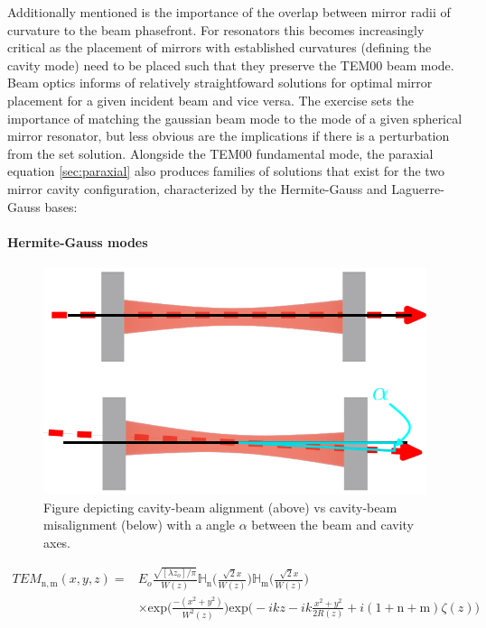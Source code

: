 Additionally mentioned is the importance of the overlap between mirror radii of curvature to the beam phasefront. For resonators this becomes increasingly critical as the placement of mirrors with established curvatures (defining the cavity mode) need to be placed such that they preserve the TEM00 beam mode. Beam optics informs of relatively straightfoward solutions for optimal mirror placement for a given incident beam and vice versa. The exercise sets the importance of matching the gaussian beam mode to the mode of a given spherical mirror resonator, but less obvious are the implications if there is a perturbation from the set solution. Alongside the TEM00 fundamental mode, the paraxial equation \autoref{sec:paraxial} also produces families of solutions that exist for the two mirror cavity configuration, characterized by the Hermite-Gauss and Laguerre-Gauss bases:

\paragraph*{Hermite-Gauss modes}

\begin{figure}[H]
	\centering
	\includegraphics[width=.7\textwidth]{figs/INTRO/FP_misalignment.pdf}
	\caption{Figure depicting cavity-beam alignment (above) vs cavity-beam misalignment (below) with a angle $\alpha$ between the beam and cavity axes. }
	\label{fig:fp_misalignment}
\end{figure}

\begin{equation}\label{eq:HG_beam}
	\begin{split}
		TEM_\mathrm{n,m}(x,y,z) = & E_o \frac{\sqrt{[\lambda z_o] / \pi}}{W(z)}\mathbb{H}_\mathrm{n}\bigg(\frac{\sqrt{2}x}{W(z)}\bigg)\mathbb{H}_\mathrm{m}\bigg(\frac{\sqrt{2}x}{W(z)}\bigg)\\
					& \times \mathrm{exp}\bigg(\frac{-(x^2+y^2)}{W^2(z)}\bigg) \mathrm{exp}\bigg(-ikz - ik\frac{x^2 + y^2}{2R(z)} + i (1+\mathrm{n}+\mathrm{m})\zeta(z)\bigg)
	\end{split}
\end{equation}

